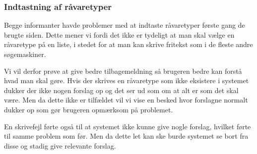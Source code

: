 \subsubsection{Indtastning af råvaretyper}
Begge informanter havde problemer med at indtaste råvaretyper første gang de brugte siden.
Dette mener vi fordi det ikke er tydeligt at man skal vælge en råvaretype på en liste, i stedet for at man kan skrive fritekst som i de fleste andre søgemaskiner.

Vi vil derfor prøve at give bedre tilbagemeldning så brugeren bedre kan forstå hvad man skal gøre. 
Hvis der skrives en råvaretype som ikke eksistere i systemet dukker der ikke nogen forslag op og det ser ud som om at alt er som det skal være.
Men da dette ikke er tilfældet vil vi vise en besked hvor forslagne normalt dukker op som gør brugeren opmærksom på problemet.

En skrivefejl førte også til at systemet ikke kunne give nogle forslag, hvilket førte til samme problem som før. Men da dette let kan ske burde systemet se bort fra disse og stadig give relevante forslag.

